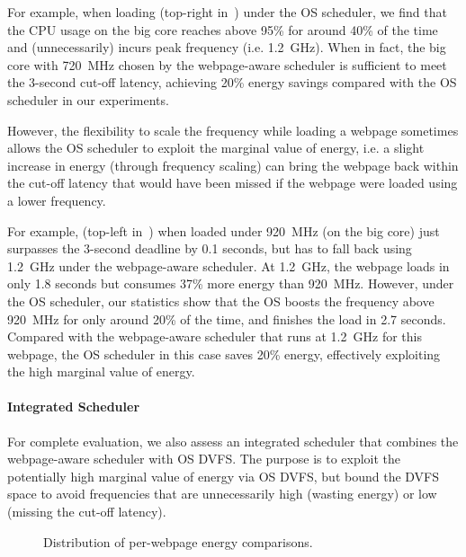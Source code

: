 For example, when loading  (top-right in~) under the OS scheduler, we find that the CPU usage on the big core reaches above 95\% for around 40\% of the time and (unnecessarily) incurs peak frequency (i.e. 1.2~GHz).  When in fact, the big core with 720~MHz chosen by the webpage-aware scheduler is sufficient  to meet the 3-second cut-off latency, achieving 20\% energy savings compared with the OS scheduler in our experiments.

However, the flexibility to scale the frequency while loading a webpage sometimes allows the OS scheduler to exploit the marginal value of energy, i.e. a slight increase in energy (through frequency scaling) can bring the webpage back within the cut-off latency that would have been missed if the webpage were loaded using a lower frequency.

For example,  (top-left in~) when loaded under 920~MHz (on the big core) just surpasses the 3-second deadline by 0.1 seconds, but has to fall back using 1.2~GHz under the webpage-aware scheduler. At 1.2~GHz, the webpage loads in only 1.8 seconds but consumes 37\% more energy than 920~MHz. However, under the OS scheduler, our statistics show that the OS boosts the frequency above 920~MHz for only around 20\% of the time, and finishes the load in 2.7 seconds. Compared with the webpage-aware scheduler that runs at 1.2~GHz for this webpage, the OS scheduler in this case saves 20\% energy, effectively exploiting the high marginal value of energy.

\paragraph{Integrated Scheduler} For complete evaluation, we also assess an integrated scheduler that combines the webpage-aware scheduler with OS DVFS. The purpose is to exploit the potentially high marginal value of energy via OS DVFS, but bound the DVFS space to avoid frequencies that are unnecessarily high (wasting energy) or low (missing the cut-off latency).

\begin{figure}[t]
\hspace*{15pt}
\caption{Distribution of per-webpage energy comparisons.}
\label{fig:e_saving}
\end{figure}

